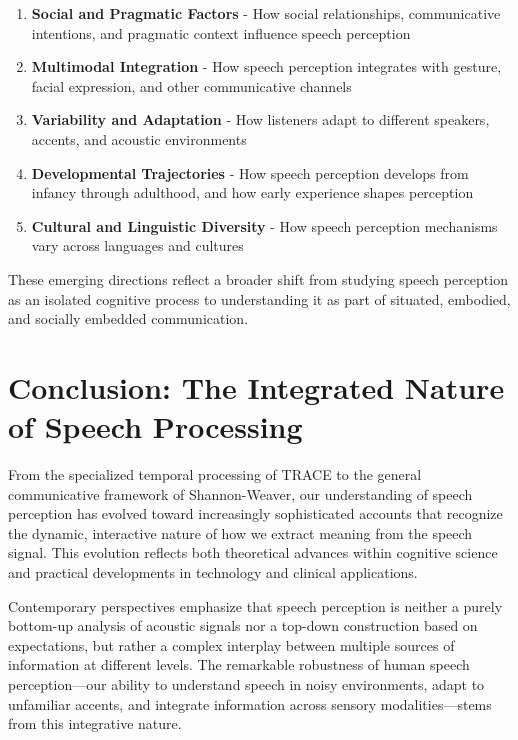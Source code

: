 \documentclass[12pt,a4paper]{article}
\begin{document}
\begin{tcolorbox}[enhanced, colback=yellow!5, colframe=yellow!75!black, title=Emerging Research Directions]
\begin{enumerate}
\item \textbf{Social and Pragmatic Factors} - How social relationships, communicative intentions, and pragmatic context influence speech perception

\item \textbf{Multimodal Integration} - How speech perception integrates with gesture, facial expression, and other communicative channels

\item \textbf{Variability and Adaptation} - How listeners adapt to different speakers, accents, and acoustic environments

\item \textbf{Developmental Trajectories} - How speech perception develops from infancy through adulthood, and how early experience shapes perception

\item \textbf{Cultural and Linguistic Diversity} - How speech perception mechanisms vary across languages and cultures
\end{enumerate}
\end{tcolorbox}

These emerging directions reflect a broader shift from studying speech perception as an isolated cognitive process to understanding it as part of situated, embodied, and socially embedded communication.

\section{Conclusion: The Integrated Nature of Speech Processing}

From the specialized temporal processing of TRACE to the general communicative framework of Shannon-Weaver, our understanding of speech perception has evolved toward increasingly sophisticated accounts that recognize the dynamic, interactive nature of how we extract meaning from the speech signal. This evolution reflects both theoretical advances within cognitive science and practical developments in technology and clinical applications.

Contemporary perspectives emphasize that speech perception is neither a purely bottom-up analysis of acoustic signals nor a top-down construction based on expectations, but rather a complex interplay between multiple sources of information at different levels. The remarkable robustness of human speech perception—our ability to understand speech in noisy environments, adapt to unfamiliar accents, and integrate information across sensory modalities—stems from this integrative nature.
\end{document}
